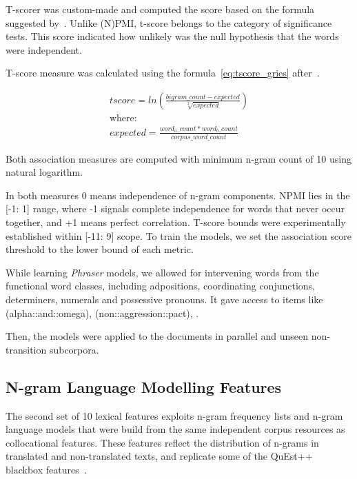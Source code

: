 T-scorer was custom-made and computed the score based on the formula suggested by~\citet{Gries2010}. Unlike (N)PMI, t-score belongs to the category of significance tests. This score indicated  how unlikely was the null hypothesis that the words were independent.

T-score measure was calculated using the formula~\ref{eq:tscore_gries} after~\citet{Gries2010}. 

\begin{equation}\label{eq:tscore_gries}
\begin{split}
tscore = ln(\frac{bigram\_count - expected}{\sqrt[2]{expected}}) \\
\text{where:}\\
expected = \frac{word_a\_count * word_b\_count}{corpus\_word\_count}
\end{split}
\end{equation}

Both association measures are computed with minimum n-gram count of 10 using natural logarithm. %
 
In both measures 0 means independence of n-gram components. NPMI lies in the [-1: 1] range, where -1 signals complete independence for words that never occur together, and +1 means perfect correlation. T-score bounds were experimentally established within [-11: 9] scope.
To train the models, we set the association score threshold to the lower bound of each metric.

While learning \textit{Phraser} models, we allowed for intervening words from the functional word classes, including adpositions, coordinating conjunctions, determiners, numerals and possessive pronouns. It gave access to items like  (alpha::and::omega),  (non::aggression::pact), .

Then, the models were applied to the documents in parallel and unseen non-transition subcorpora.

\subsection{\label{ssec:ngram}N-gram Language Modelling Features}

The second set of 10 lexical features exploits n-gram frequency lists and n-gram language models that were build from the same independent corpus resources as collocational features. These features reflect the distribution of n-grams in translated and non-translated texts, and replicate some of the QuEst++ blackbox features~\cite{Shah2013}. 

